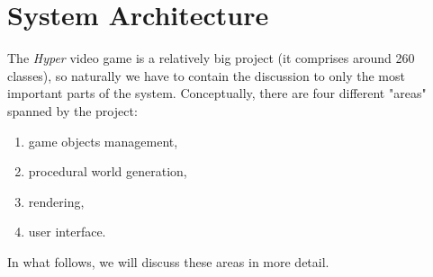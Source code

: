 \chapter{System Architecture} \label{ch:system_architecture}
The \textit{Hyper} video game is a relatively big project (it comprises around 260 classes), so naturally we have to contain the discussion to only the most important parts of the system.
Conceptually, there are four different "areas" spanned by the project:
\begin{enumerate}
  \item game objects management,
  \item procedural world generation,
  \item rendering,
  \item user interface.
\end{enumerate}

In what follows, we will discuss these areas in more detail.






